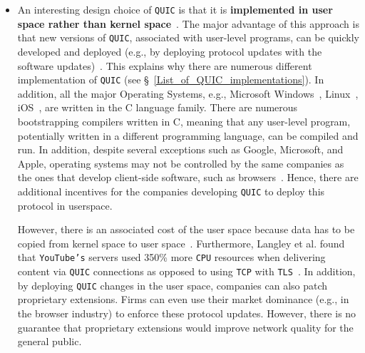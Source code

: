 \documentclass[12pt,a4paper]{report}
\newcommand\note[2]{{\color{#1}\bf #2}}
\newcommand\simon[1]{\ifcomments{\note{cyan}{SM: #1}}\fi}
\begin{document}
\begin{itemize}
  

  \item 
  An interesting design choice of \texttt{QUIC} is that it is \textbf{implemented in user space rather than kernel space}~\cite{the-road-to-quic, Implementation_and_Performance_Evaluation_of_the_QUIC_Protocol_in_Linux_Kernel, quic-and-http-3-too-big-to-fail}.
  The major advantage of this approach is that new versions of \texttt{QUIC}, associated with user-level programs, can be quickly developed and deployed (e.g., by deploying protocol updates with the software updates)~\cite{the-road-to-quic}.
  This explains why there are numerous different implementation of \texttt{QUIC} (see \S~\ref{List_of_QUIC_implementations}).
  In addition, all the major Operating Systems, e.g., Microsoft Windows~\cite{OS_implementations}, Linux~\cite{OS_implementations, linux_kernel_programming_language}, iOS~\cite{OS_implementations, IOKitFundamentals}, are written in the C language family.
  There are numerous bootstrapping compilers written in C, meaning that any user-level program, potentially written in a different programming language, can be compiled and run.
  In addition, despite several exceptions such as Google, Microsoft, and Apple, operating systems may not be controlled by the same companies as the ones that develop client-side software, such as browsers~\cite{2016-12-01-quic-tou}.
  Hence, there are additional incentives for the companies developing \texttt{QUIC} to deploy this protocol in userspace.
  
  However, there is an associated cost of the user space because data has to be copied from kernel space to user space~\cite{benchmarking-quic}.
  Furthermore, Langley et al. found that \texttt{YouTube's} servers used 350\% more \texttt{CPU} resources when delivering content via \texttt{QUIC} connections as opposed to using \texttt{TCP} with \texttt{TLS}~\cite{The_QUIC_Transport_Protocol_Design_and_Internet-Scale_Deployment}.
  In addition, by deploying \texttt{QUIC} changes in the user space, companies can also patch proprietary extensions.
  Firms can even use their market dominance (e.g., in the browser industry) to enforce these protocol updates.
  However, there is no guarantee that proprietary extensions would improve network quality for the general public. 





\end{itemize}
\end{document}
